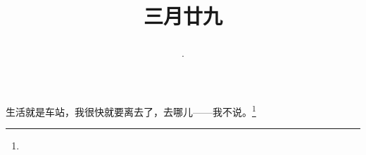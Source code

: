 \title{\date[d=7,m=5,y=2024][year:cn-y,年,month:cn,day:cn,日,·,weekday]·三月廿九 }
生活就是车站，我很快就要离去了，去哪儿——我不说。\footnote{ }

